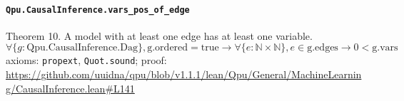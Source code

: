 \documentclass[11pt]{article}
\begin{document}
\paragraph{\texttt{Qpu.CausalInference.vars\_pos\_of\_edge}}
Theorem 10. A model with at least one edge has at least one variable.
\[ \forall \{g : \mathrm{Qpu.CausalInference.Dag}\}, \mathrm{g.ordered} = \mathrm{true} \to \forall \{e : \mathbb{N} \times \mathbb{N}\}, e \in \mathrm{g.edges} \to 0 < \mathrm{g.vars} \]
\noindent axioms: \texttt{propext}, \texttt{Quot.sound}; proof: \url{https://github.com/uuidna/qpu/blob/v1.1.1/lean/Qpu/General/MachineLearning/CausalInference.lean\#L141}
\end{document}
